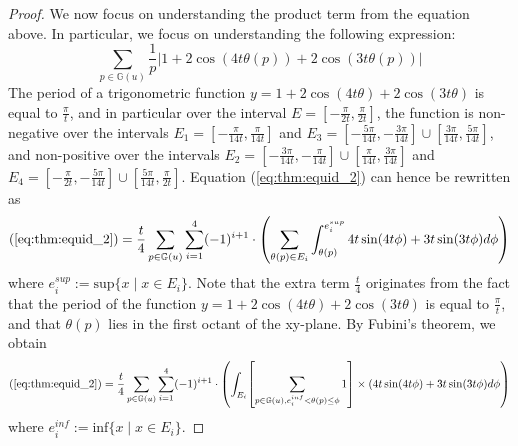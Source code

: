 \documentclass[12pt]{amsart}
\numberwithin{equation}{section} %
\theoremstyle{definition} \newtheorem{definition}[counter]{Definition}
\theoremstyle{remark} \newtheorem{nonexam}[counter]{Non-example}
\let\originalleft\left \let\originalright\right
\renewcommand{\left}{\mathopen{}\mathclose\bgroup\originalleft}
\renewcommand{\right}{\aftergroup\egroup\originalright}
\begin{document}
\begin{proof}
    We now focus on understanding the product term from the equation above. In particular, we focus on understanding the following expression:
    \begin{equation} \label{eq:thm:equid_2}
        \sum_{p \in \mathbb{G}(u)} \frac{1}{p} |1 + 2 \cos(4t \theta(p)) + 2 \cos(3t \theta(p))|
    \end{equation}
    The period of a trigonometric function $y = 1 + 2 \cos (4t \theta) + 2 \cos(3t \theta)$ is equal to $\frac{\pi}{t}$, and in particular over the interval $E = [-\frac{\pi}{2t}, \frac{\pi}{2t}]$, the function is non-negative over the intervals $E_1 = [-\frac{\pi}{14t}, \frac{\pi}{14t}]$ and $E_3 = [-\frac{5\pi}{14t}, -\frac{3\pi}{14t}] \cup [\frac{3\pi}{14t}, \frac{5\pi}{14t}]$, and non-positive over the intervals $E_2 = [-\frac{3\pi}{14t}, -\frac{\pi}{14t}] \cup [\frac{\pi}{14t}, \frac{3\pi}{14t}]$ and $E_4 = [-\frac{\pi}{2t}, -\frac{5\pi}{14t}] \cup [\frac{5\pi}{14t}, \frac{\pi}{2t}]$. Equation (\ref{eq:thm:equid_2}) can hence be rewritten as
    \begin{equation}
        (\ref{eq:thm:equid_2}) = \frac{t}{4} \sum_{p \in \mathbb{G}(u)} \sum_{i=1}^4 (-1)^{i+1} \cdot \left( \sum_{\theta(p) \in E_i} \int_{\theta(p)}^{e_{i}^{sup}} 4t \sin(4t \phi) + 3t \sin(3t\phi) d\phi \right)
    \end{equation}
    where $e_i^{sup} := \text{sup}\{x \; | \; x \in E_i\}$. Note that the extra term $\frac{t}{4}$ originates from the fact that the period of the function $y = 1 + 2 \cos (4t \theta) + 2 \cos(3t \theta)$ is equal to $\frac{\pi}{t}$, and that $\theta(p)$ lies in the first octant of the xy-plane. By Fubini's theorem, we obtain
    \begin{equation}
        (\ref{eq:thm:equid_2}) = \frac{t}{4} \sum_{p \in \mathbb{G}(u)} \sum_{i=1}^4 (-1)^{i+1} \cdot \left(\int_{E_i} \left[ \sum_{p \in \mathbb{G}(u), e_i^{inf} < \theta(p) \leq \phi} 1 \right] \times (4t \sin(4t \phi) + 3t \sin(3t\phi) d\phi \right)
    \end{equation}
    where $e_i^{inf} := \text{inf}\{x \; | \; x \in E_i\}$. 


\end{proof}
\end{document}
